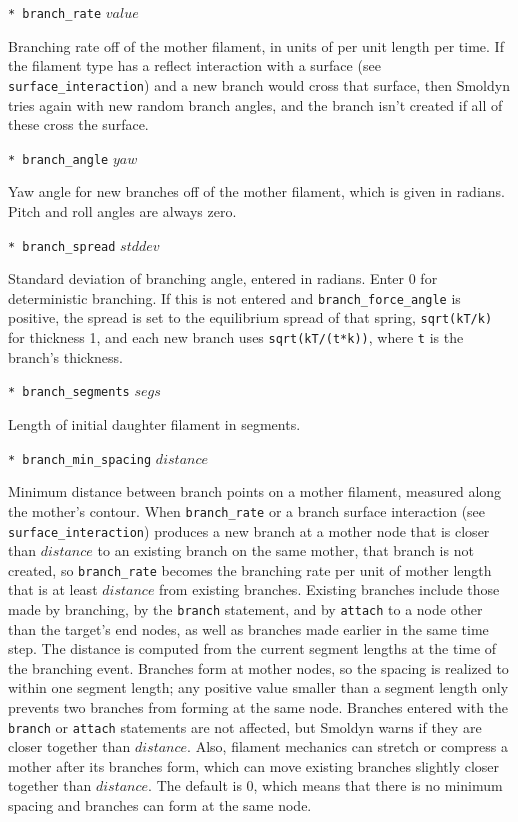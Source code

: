\documentclass {scrbook}
\newcommand {\ttt} {\texttt}
\begin{document}
\begin{description}
\item{\ttt{* branch\_rate} $value$} %

Branching rate off of the mother filament, in units of per unit length per time. If the filament type has a reflect interaction with a surface (see \ttt{surface\_interaction}) and a new branch would cross that surface, then Smoldyn tries again with new random branch angles, and the branch isn't created if all of these cross the surface.

\item{\ttt{* branch\_angle} $yaw$} %

Yaw angle for new branches off of the mother filament, which is given in radians. Pitch and roll angles are always zero.

\item{\ttt{* branch\_spread} $stddev$} %

Standard deviation of branching angle, entered in radians. Enter 0 for deterministic branching. If this is not entered and \ttt{branch\_force\_angle} is positive, the spread is set to the equilibrium spread of that spring, \ttt{sqrt(kT/k)} for thickness 1, and each new branch uses \ttt{sqrt(kT/(t*k))}, where \ttt{t} is the branch's thickness.

\item{\ttt{* branch\_segments} $segs$} %

Length of initial daughter filament in segments.

\item{\ttt{* branch\_min\_spacing} $distance$}

Minimum distance between branch points on a mother filament, measured along the mother's contour. When \ttt{branch\_rate} or a branch surface interaction (see \ttt{surface\_interaction}) produces a new branch at a mother node that is closer than $distance$ to an existing branch on the same mother, that branch is not created, so \ttt{branch\_rate} becomes the branching rate per unit of mother length that is at least $distance$ from existing branches. Existing branches include those made by branching, by the \ttt{branch} statement, and by \ttt{attach} to a node other than the target's end nodes, as well as branches made earlier in the same time step. The distance is computed from the current segment lengths at the time of the branching event. Branches form at mother nodes, so the spacing is realized to within one segment length; any positive value smaller than a segment length only prevents two branches from forming at the same node. Branches entered with the \ttt{branch} or \ttt{attach} statements are not affected, but Smoldyn warns if they are closer together than $distance$. Also, filament mechanics can stretch or compress a mother after its branches form, which can move existing branches slightly closer together than $distance$. The default is 0, which means that there is no minimum spacing and branches can form at the same node.


\end{description}
\end{document}
